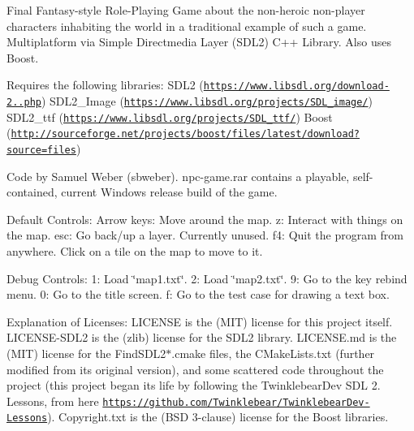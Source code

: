 Final Fantasy-\/style Role-\/\+Playing Game about the non-\/heroic non-\/player characters inhabiting the world in a traditional example of such a game. Multiplatform via Simple Directmedia Layer (S\+D\+L2) C++ Library. Also uses Boost.

Requires the following libraries\+: S\+D\+L2 (\href{https://www.libsdl.org/download-2.0.php}{\tt https\+://www.\+libsdl.\+org/download-\/2..\+php}) S\+D\+L2\+\_\+\+Image (\href{https://www.libsdl.org/projects/SDL_image/}{\tt https\+://www.\+libsdl.\+org/projects/\+S\+D\+L\+\_\+image/}) S\+D\+L2\+\_\+ttf (\href{https://www.libsdl.org/projects/SDL_ttf/}{\tt https\+://www.\+libsdl.\+org/projects/\+S\+D\+L\+\_\+ttf/}) Boost (\href{http://sourceforge.net/projects/boost/files/latest/download?source=files}{\tt http\+://sourceforge.\+net/projects/boost/files/latest/download?source=files})

Code by Samuel Weber (sbweber). npc-\/game.\+rar contains a playable, self-\/contained, current Windows release build of the game.

Default Controls\+: Arrow keys\+: Move around the map. z\+: Interact with things on the map. esc\+: Go back/up a layer. Currently unused. f4\+: Quit the program from anywhere. Click on a tile on the map to move to it.

Debug Controls\+: 1\+: Load \char`\"{}map1.\+txt\char`\"{}. 2\+: Load \char`\"{}map2.\+txt\char`\"{}. 9\+: Go to the key rebind menu. 0\+: Go to the title screen. f\+: Go to the test case for drawing a text box.

Explanation of Licenses\+: L\+I\+C\+E\+N\+SE is the (M\+IT) license for this project itself. L\+I\+C\+E\+N\+S\+E-\/\+S\+D\+L2 is the (zlib) license for the S\+D\+L2 library. L\+I\+C\+E\+N\+S\+E.\+md is the (M\+IT) license for the Find\+S\+D\+L2$\ast$.cmake files, the C\+Make\+Lists.\+txt (further modified from its original version), and some scattered code throughout the project (this project began its life by following the Twinklebear\+Dev S\+DL 2. Lessons, from here \href{https://github.com/Twinklebear/TwinklebearDev-Lessons}{\tt https\+://github.\+com/\+Twinklebear/\+Twinklebear\+Dev-\/\+Lessons}). Copyright.\+txt is the (B\+SD 3-\/clause) license for the Boost libraries. 